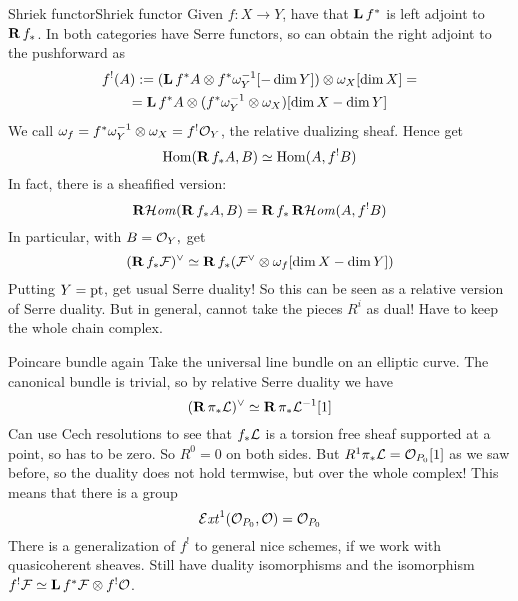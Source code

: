 \begin{example}{Shriek functor}{Shriek functor} Given $f:X\rightarrow Y$, have that $\operatorname{\mathbf{L}} f^*$ is left adjoint to $\operatorname{\mathbf{R}} f_{*}$. In both categories have Serre functors, so can obtain the right adjoint to the pushforward as $$\begin{gathered}
f^!(A):=(\operatorname{\mathbf{L}} f^*A\otimes f^*\omega_{Y}^{-1}[-\dim Y])\otimes \omega_{X}[\dim X]=\\=\operatorname{\mathbf{L}} f^*A\otimes (f^*\omega_{Y}^{-1}\otimes \omega_{X})[\dim X -\dim Y]\end{gathered}$$
We call $\omega_{f}=f^*\omega_{Y}^{-1}\otimes \omega_{X}=f^!\mathcal{O}_{Y}$, the relative dualizing sheaf. Hence get $$\operatorname{Hom}(\operatorname{\mathbf{R}} f_{*}A, B)\simeq \operatorname{Hom}(A, f^!B)$$
In fact, there is a sheafified version: $$\operatorname{\mathbf{R}\mathcal{H}\mathit{om}}(\operatorname{\mathbf{R}} f_{*}A,B)=\operatorname{\mathbf{R}} f_{*}\operatorname{\mathbf{R}\mathcal{H}\mathit{om}}(A,f^!B)$$
In particular, with $B=\mathcal{O}_{Y},$ get $$(\operatorname{\mathbf{R}} f_{*}\mathcal{F})^\vee\simeq \operatorname{\mathbf{R}} f_{*}(\mathcal{F}^\vee\otimes\omega_{f}[\dim X-\dim Y])$$
Putting $Y=\mathrm{pt}$, get usual Serre duality! So this can be seen as a relative version of Serre duality. But in general, cannot take the pieces $R^i$ as dual! Have to keep the whole chain complex.
\end{example}

\begin{example}{Poincare bundle again}{} Take the universal line bundle on an elliptic curve. The canonical bundle is trivial, so by relative Serre duality we have $$(\operatorname{\mathbf{R}} \pi_{*}\mathcal{L})^\vee\simeq \operatorname{\mathbf{R}} \pi_{*}\mathcal{L}^{-1}[1]$$Can use Cech resolutions to see that $f_*\mathcal{L}$ is a torsion free sheaf supported at a point, so has to be zero. So $R^0=0$ on both sides. But $R^1\pi_{*}\mathcal{L}=\mathcal{O}_{P_{0}}[1]$ as we saw before, so the duality does not hold termwise, but over the whole complex! This means that there is a group $$\operatorname{\mathcal{E}\mathit{xt}}^1(\mathcal{O}_{P_{0}}, \mathcal{O})=\mathcal{O}_{P_{0}}$$There is a generalization of $f^!$ to general nice schemes, if we work with quasicoherent sheaves. Still have duality isomorphisms and the isomorphism $f^!\mathcal{F}\simeq \operatorname{\mathbf{L}} f^*\mathcal{F}\otimes f^!\mathcal{O}$. \end{example}



